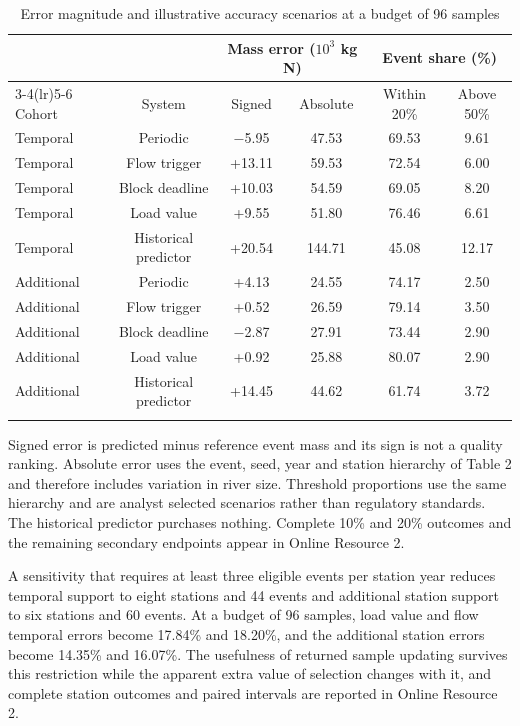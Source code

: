 \documentclass[lineno,pdflatex,sn-apa]{sn-jnl}%
\theoremstyle{thmstyleone}%
\theoremstyle{thmstyletwo}%
\theoremstyle{thmstylethree}%
\begin{document}
\begin{table}[htbp]
\caption{Error magnitude and illustrative accuracy scenarios at a budget of 96 samples}\label{tab:3}
\footnotesize
\setlength{\tabcolsep}{2pt}
\begin{tabular}{@{}lccccc@{}}
\toprule
& & \multicolumn{2}{c}{Mass error ($10^{3}$ kg N)} & \multicolumn{2}{c}{Event share (\%)} \\
\cmidrule(lr){3-4}\cmidrule(lr){5-6}
Cohort & System & Signed & Absolute & Within 20\% & Above 50\% \\
\midrule
Temporal & Periodic & $-$5.95 & 47.53 & 69.53 & 9.61\\
Temporal & Flow trigger & +13.11 & 59.53 & 72.54 & 6.00\\
Temporal & Block deadline & +10.03 & 54.59 & 69.05 & 8.20\\
Temporal & Load value & +9.55 & 51.80 & 76.46 & 6.61\\
Temporal & Historical predictor & +20.54 & 144.71 & 45.08 & 12.17\\
Additional & Periodic & +4.13 & 24.55 & 74.17 & 2.50\\
Additional & Flow trigger & +0.52 & 26.59 & 79.14 & 3.50\\
Additional & Block deadline & $-$2.87 & 27.91 & 73.44 & 2.90\\
Additional & Load value & +0.92 & 25.88 & 80.07 & 2.90\\
Additional & Historical predictor & +14.45 & 44.62 & 61.74 & 3.72\\
\botrule
\end{tabular}
\end{table}

Signed error is predicted minus reference event mass and its sign is not a quality ranking. Absolute error uses the event, seed, year and station hierarchy of Table 2 and therefore includes variation in river size. Threshold proportions use the same hierarchy and are analyst selected scenarios rather than regulatory standards. The historical predictor purchases nothing. Complete 10\% and 20\% outcomes and the remaining secondary endpoints appear in Online Resource 2.

A sensitivity that requires at least three eligible events per station year reduces temporal support to eight stations and 44 events and additional station support to six stations and 60 events. At a budget of 96 samples, load value and flow temporal errors become 17.84\% and 18.20\%, and the additional station errors become 14.35\% and 16.07\%. The usefulness of returned sample updating survives this restriction while the apparent extra value of selection changes with it, and complete station outcomes and paired intervals are reported in Online Resource 2.
\end{document}
